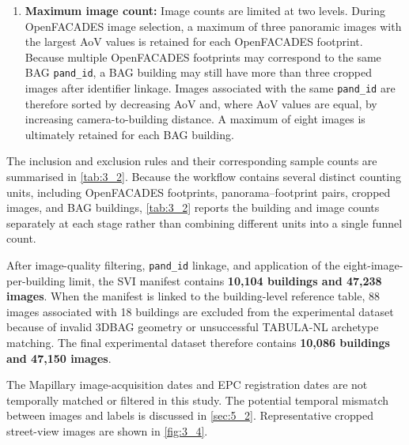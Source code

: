 \begin{enumerate}
\item \textbf{Maximum image count:} Image counts are limited at two levels. During OpenFACADES image selection, a maximum of three panoramic images with the largest AoV values is retained for each OpenFACADES footprint. Because multiple OpenFACADES footprints may correspond to the same BAG \texttt{pand\_id}, a BAG building may still have more than three cropped images after identifier linkage. Images associated with the same \texttt{pand\_id} are therefore sorted by decreasing AoV and, where AoV values are equal, by increasing camera-to-building distance. A maximum of eight images is ultimately retained for each BAG building.
\end{enumerate}


The inclusion and exclusion rules and their corresponding sample counts are summarised in \cref{tab:3_2}. Because the workflow contains several distinct counting units, including OpenFACADES footprints, panorama--footprint pairs, cropped images, and BAG buildings, \cref{tab:3_2} reports the building and image counts separately at each stage rather than combining different units into a single funnel count.


After image-quality filtering, \texttt{pand\_id} linkage, and application of the eight-image-per-building limit, the SVI manifest contains \textbf{10,104 buildings and 47,238 images}. When the manifest is linked to the building-level reference table, 88 images associated with 18 buildings are excluded from the experimental dataset because of invalid 3DBAG geometry or unsuccessful TABULA-NL archetype matching. The final experimental dataset therefore contains \textbf{10,086 buildings and 47,150 images}.


The Mapillary image-acquisition dates and EPC registration dates are not temporally matched or filtered in this study. The potential temporal mismatch between images and labels is discussed in \cref{sec:5_2}. Representative cropped street-view images are shown in \cref{fig:3_4}.


\begin{table}[htbp]
\centering
{}
\caption{Data inclusion and exclusion rules. The table reports the processing stage, counting unit, operational condition, design rationale, remaining building count, and remaining image count}
\label{tab:3_2}
\end{table}



